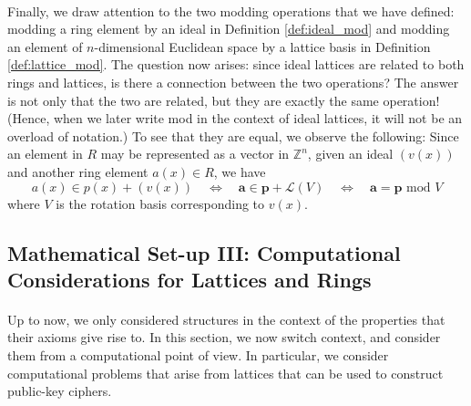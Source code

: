 \documentclass{article}
\theoremstyle{definition}
\theoremstyle{example}
\renewcommand{\L}{\mathcal{L}}
\newcommand{\Int}{\mathbb{Z}}
\renewcommand{\mod}{\,\,\text{mod}\,\,}
\renewcommand{\vec}[1]{\mathbf{#1}}
\begin{document}
\paragraph{} Finally, we draw attention to the two modding operations that we
have defined: modding a ring element by an ideal in Definition
\ref{def:ideal_mod} and modding an element of $n$-dimensional Euclidean space by
a lattice basis in Definition \ref{def:lattice_mod}. The question now arises: since ideal
lattices are related to both rings and lattices, is there a connection between
the two operations? The answer is not only that the two are related, but they
are exactly the same operation! (Hence, when we later write mod in the context of
ideal lattices, it will not be an overload of notation.) To see that they are
equal, we observe the following: Since an element in $R$ may be represented as a
vector in $\Int^n$, given an ideal $(v(x))$ and another ring element $a(x) \in
R$, we have
\[
  a(x) \in p(x) + (v(x)) \quad\Leftrightarrow\quad \vec{a} \in \vec{p} + \L(V)
  \quad\Leftrightarrow\quad \vec{a} = \vec{p} \mod V
\]
where $V$ is the rotation basis corresponding to $v(x)$.
\subsection{Mathematical Set-up III: Computational Considerations for Lattices and Rings}
\paragraph{} Up to now, we only considered structures in the context of the
properties that their axioms give rise to. In this section, we now switch
context, and consider them from a computational point of view. In particular,
we consider computational problems that arise from lattices that can be used to
construct public-key ciphers.
\end{document}
